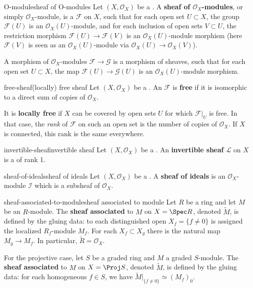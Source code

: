 \begin{topic}{O-module}{sheaf of O-modules}
    Let $(X, \mathcal{O}_X)$ be a . A \textbf{sheaf of $\mathcal{O}_X$-modules}, or simply $\mathcal{O}_X$-module, is a  $\mathcal{F}$ on $X$, such that for each open set $U \subset X$, the group $\mathcal{F}(U)$ is an $\mathcal{O}_X(U)$-module, and for each inclusion of open sets $V \subset U$, the restriction morphism $\mathcal{F}(U) \to \mathcal{F}(V)$ is an $\mathcal{O}_X(U)$-module morphism (here $\mathcal{F}(V)$ is seen as an $\mathcal{O}_X(U)$-module via $\mathcal{O}_X(U) \to \mathcal{O}_X(V)$).
    
    A morphism of $\mathcal{O}_X$-modules $\mathcal{F} \to \mathcal{G}$ is a morphism of sheaves, such that for each open set $U \subset X$, the map $\mathcal{F}(U) \to \mathcal{G}(U)$ is an $\mathcal{O}_X(U)$-module morphism.
\end{topic}

\begin{topic}{free-sheaf}{(locally) free sheaf}
    Let $(X, \mathcal{O}_X)$ be a . An  $\mathcal{F}$ is \textbf{free} if it is isomorphic to a direct sum of copies of $\mathcal{O}_X$.
    
    It is \textbf{locally free} if $X$ can be covered by open sets $U$ for which $\mathcal{F}|_U$ is free. In that case, the \textit{rank} of $\mathcal{F}$ on such an open set is the number of copies of $\mathcal{O}_X$. If $X$ is connected, this rank is the same everywhere.
\end{topic}

\begin{topic}{invertible-sheaf}{invertible sheaf}
    Let $(X, \mathcal{O}_X)$ be a . An \textbf{invertible sheaf} $\mathcal{L}$ on $X$ is a   of rank 1.
\end{topic}

\begin{topic}{sheaf-of-ideals}{sheaf of ideals}
    Let $(X, \mathcal{O}_X)$ be a . A \textbf{sheaf of ideals} is an $\mathcal{O}_X$-module $\mathcal{I}$ which is a subsheaf of $\mathcal{O}_X$.
\end{topic}

\begin{topic}{sheaf-associated-to-module}{sheaf associated to module}
    Let $R$ be a ring and let $M$ be an $R$-module. The \textbf{sheaf associated} to $M$ on $X = \Spec R$, denoted $\tilde{M}$, is defined by the gluing data: to each distinguished open $X_f = \{ f \ne 0 \}$ is assigned the localized $R_f$-module $M_f$. For each $X_f \subset X_g$ there is the natural map $M_g \to M_f$. In particular, $\tilde{R} = \mathcal{O}_X$.
    
    For the projective case, let $S$ be a graded ring and $M$ a graded $S$-module. The \textbf{sheaf associated} to $M$ on $X = \Proj S$, denoted $\tilde{M}$, is defined by the gluing data: for each homogeneous $f \in S$, we have $\tilde{M}|_{\{ f \ne 0\}} \simeq (M_f)_0$.
\end{topic}

